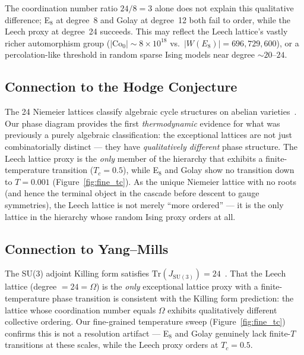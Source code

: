 \documentclass[11pt,a4paper]{article}
\begin{document}
The coordination number ratio $24/8 = 3$ alone does not explain this qualitative difference; E$_8$ at degree~8 and Golay at degree~12 both fail to order, while the Leech proxy at degree~24 succeeds.
This may reflect the Leech lattice's vastly richer automorphism group ($|\mathrm{Co}_0| \sim 8 \times 10^{18}$ vs.\ $|W(E_8)| = 696{,}729{,}600$), or a percolation-like threshold in random sparse Ising models near degree $\sim 20$--$24$.

\subsection{Connection to the Hodge Conjecture}

The 24 Niemeier lattices classify algebraic cycle structures on abelian varieties~\cite{u24_hodge}.
Our phase diagram provides the first \emph{thermodynamic} evidence for what was previously a purely algebraic classification: the exceptional lattices are not just combinatorially distinct --- they have \emph{qualitatively different} phase structure.
The Leech lattice proxy is the \emph{only} member of the hierarchy that exhibits a finite-temperature transition ($T_c = 0.5$), while E$_8$ and Golay show no transition down to $T = 0.001$ (Figure~\ref{fig:fine_tc}).
As the unique Niemeier lattice with no roots (and hence the terminal object in the cascade before descent to gauge symmetries), the Leech lattice is not merely ``more ordered'' --- it is the only lattice in the hierarchy whose random Ising proxy orders at all.

\subsection{Connection to Yang--Mills}

The SU(3) adjoint Killing form satisfies $\mathrm{Tr}(J_{\mathrm{SU}(3)}) = 24$~\cite{u24_ym}.
That the Leech lattice (degree $= 24 = \Omega$) is the \emph{only} exceptional lattice proxy with a finite-temperature phase transition is consistent with the Killing form prediction: the lattice whose coordination number equals $\Omega$ exhibits qualitatively different collective ordering.
Our fine-grained temperature sweep (Figure~\ref{fig:fine_tc}) confirms this is not a resolution artifact --- E$_8$ and Golay genuinely lack finite-$T$ transitions at these scales, while the Leech proxy orders at $T_c = 0.5$.

\end{document}
